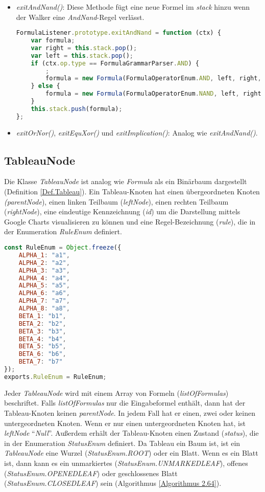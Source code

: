\begin{itemize}
\item	\textit{exitAndNand()}: Diese Methode fügt eine neue Formel im \textit{stack} hinzu wenn der Walker eine \textit{AndNand}-Regel verlässt.
\begin{lstlisting}[language=JavaScript, caption= exitAndNand() (Klasse FormulaListener), basicstyle=\scriptsize]
FormulaListener.prototype.exitAndNand = function (ctx) {
    var formula;
    var right = this.stack.pop();
    var left = this.stack.pop();
    if (ctx.op.type == FormulaGrammarParser.AND) {
        ;
        formula = new Formula(FormulaOperatorEnum.AND, left, right, FormulaTypeEnum.ALPHA);
    } else {
        formula = new Formula(FormulaOperatorEnum.NAND, left, right, FormulaTypeEnum.BETA);
    }
    this.stack.push(formula);
};
\end{lstlisting}

\item \textit{exitOrNor()}, \textit{exitEquXor()} und \textit{exitImplication()}: Analog wie \textit{exitAndNand()}.
\end{itemize}

\subsection{TableauNode}
Die Klasse \textit{TableauNode} ist analog wie \textit{Formula} als ein Binärbaum dargestellt (Definition \ref{Def.Tableau}). Ein Tableau-Knoten hat einen übergeordneten Knoten \textit{(parentNode}), einen linken Teilbaum (\textit{leftNode}), einen rechten Teilbaum (\textit{rightNode}), eine eindeutige Kennzeichnung (\textit{id}) um die Darstellung mittels Google Charts visualisieren zu können und eine Regel-Bezeichnung (\textit{rule}), die in der Enumeration \textit{RuleEnum} definiert. 
\begin{lstlisting}[language=JavaScript, caption= RuleEnum, basicstyle=\scriptsize]
const RuleEnum = Object.freeze({
    ALPHA_1: "a1",
    ALPHA_2: "a2",
    ALPHA_3: "a3",
    ALPHA_4: "a4",
    ALPHA_5: "a5",
    ALPHA_6: "a6",
    ALPHA_7: "a7",
    ALPHA_8: "a8",
    BETA_1: "b1",
    BETA_2: "b2",
    BETA_3: "b3",
    BETA_4: "b4",
    BETA_5: "b5",
    BETA_6: "b6",
    BETA_7: "b7"
});
exports.RuleEnum = RuleEnum;
\end{lstlisting}
Jeder \textit{TableauNode} wird mit einem Array von Formeln (\textit{listOfFormulas}) beschriftet. 
Falls \textit{listOfFormulas} nur die Eingabeformel enthält, dann hat der Tableau-Knoten keinen \textit{parentNode}. In jedem Fall hat er einen, zwei oder keinen untergeordneten Knoten. Wenn er nur einen untergeordneten Knoten hat, ist \textit{leftNode} ``\textit{Null}''.
Außerdem erhält der Tableau-Knoten einen Zustand (\textit{status}), die in der Enumeration \textit{StatusEnum} definiert. Da Tableau ein Baum ist, ist ein \textit{TableauNode} eine Wurzel (\textit{\textit{StatusEnum.ROOT}}) oder ein Blatt. Wenn es ein Blatt ist, dann kann es ein unmarkiertes (\textit{StatusEnum.UNMARKEDLEAF}), offenes (\textit{StatusEnum.OPENEDLEAF}) oder geschlossenes Blatt (\textit{StatusEnum.CLOSEDLEAF}) sein (Algorithmus \ref{Algorithmus 2.64}). 

